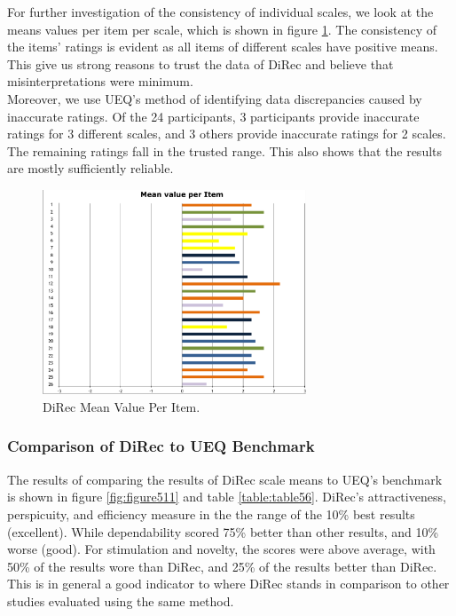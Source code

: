 For further investigation of the consistency of individual scales, we look at
the means values per item per scale, which is shown in figure
\ref{fig:figure510}. The consistency of the items' ratings is evident
as all items of different scales have positive means. This give us strong
reasons to trust the data of DiRec and believe that misinterpretations were
minimum.\\
Moreover, we use UEQ's method of identifying data discrepancies caused by
inaccurate ratings. Of the 24 participants, 3 participants provide inaccurate
ratings for 3 different scales, and 3 others provide inaccurate ratings for 2
scales. The remaining ratings fall in the trusted range. This also shows that
the results are mostly sufficiently reliable.
\begin{figure}[!htbp]
\centering
\includegraphics[width=0.7\textwidth]{figures/direc-results3}
\caption{DiRec Mean Value Per Item.}
\label{fig:figure510}
\end{figure}
\subsubsection{Comparison of DiRec to UEQ Benchmark}
The results of comparing the results of DiRec scale means to UEQ's benchmark is
shown in figure \ref{fig:figure511} and table \ref{table:table56}. DiRec's
attractiveness, perspicuity, and efficiency measure in the the range of the 10\%
best results (excellent). While dependability scored 75\% better than other
results, and 10\% worse (good). For stimulation and novelty, the scores were
above average, with 50\% of the results wore than DiRec, and 25\% of the results
better than DiRec. This is in general a good indicator to where DiRec stands in
comparison to other studies evaluated using the same method.

